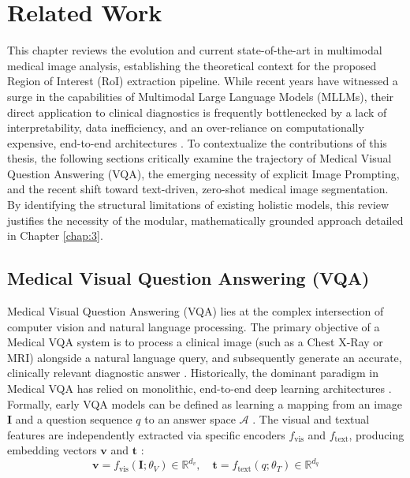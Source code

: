 

\chapter{Related Work}

This chapter reviews the evolution and current state-of-the-art in multimodal medical image analysis, establishing the theoretical context for the proposed Region of Interest (RoI) extraction pipeline. While recent years have witnessed a surge in the capabilities of Multimodal Large Language Models (MLLMs), their direct application to clinical diagnostics is frequently bottlenecked by a lack of interpretability, data inefficiency, and an over-reliance on computationally expensive, end-to-end architectures \cite{arxiv-mllms-medicine, arxiv-tinyllavamed}. To contextualize the contributions of this thesis, the following sections critically examine the trajectory of Medical Visual Question Answering (VQA), the emerging necessity of explicit Image Prompting, and the recent shift toward text-driven, zero-shot medical image segmentation. By identifying the structural limitations of existing holistic models, this review justifies the necessity of the modular, mathematically grounded approach detailed in Chapter \ref{chap:3}.

\section{Medical Visual Question Answering (VQA)}

Medical Visual Question Answering (VQA) lies at the complex intersection of computer vision and natural language processing. The primary objective of a Medical VQA system is to process a clinical image (such as a Chest X-Ray or MRI) alongside a natural language query, and subsequently generate an accurate, clinically relevant diagnostic answer \cite{arxiv-medvqa-review}.
Historically, the dominant paradigm in Medical VQA has relied on monolithic, end-to-end deep learning architectures \cite{arxiv-medvqa-review}. Formally, early VQA models can be defined as learning a mapping from an image $\mathbf{I}$ and a question sequence $q$ to an answer space $\mathcal{A}$ \cite{antol2015vqa}. The visual and textual features are independently extracted via specific encoders $f_{\text{vis}}$ and $f_{\text{text}}$, producing embedding vectors $\mathbf{v}$ and $\mathbf{t}$ \cite{benyounes2017mutan}:
\begin{equation}
\mathbf{v} = f_{\text{vis}}(\mathbf{I}; \theta_V) \in \mathbb{R}^{d_v}, \quad \mathbf{t} = f_{\text{text}}(q; \theta_T) \in \mathbb{R}^{d_q}
\end{equation}

